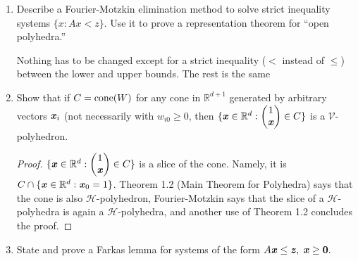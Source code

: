 \documentclass{article}
\begin{document}
\begin{enumerate}
\begin{solution}
\begin{enumerate}[label=(\roman*)]
    \item Recall that all cyclic polytopes are simplicial. The facets for $C_3(6) = C_3(\textbf{x}(0), \textbf{x}(1), \ldots, \textbf{x}(5))$ are (by Gale's evenness)
    \[\{\{1,2,3\}, \{1,3,4\}, \{1,4,5\}, \{1,5,6\}, \{1,2,6\}, \{2,3,6\}, \{3,4,6\}, \{4,5,6\}\}\]
    The inequalities can be found through a simple calculation.

    \item skipped 

    \item skipped
\end{enumerate}
\end{solution}

\item Describe a Fourier-Motzkin elimination method to solve strict inequality systems $\{x : Ax < z\}$. Use it to prove a representation theorem for ``open polyhedra.''

\begin{solution}
    Nothing has to be changed except for a strict inequality ($<$ instead of $\leq$) between the lower and upper bounds. The rest is the same
\end{solution}

\item Show that if $C = \operatorname{cone}(W)$ for any cone in $\mathbb{R}^{d+1}$ generated by arbitrary vectors $\textbf{\textit{x}}_i$ (not necessarily with $w_{i0} \geq 0$, then $\{\textbf{\textit{x}} \in \mathbb{R}^d : \begin{pmatrix}
    1 \\
    {\textbf{\textit{x}}}
\end{pmatrix} \in C\}$ is a $\mathcal{V}$-polyhedron.

\begin{proof}
    $\{\textbf{\textit{x}} \in \mathbb{R}^d : \begin{pmatrix}
    1 \\
    {\textbf{\textit{x}}}
\end{pmatrix} \in C\}$ is a slice of the cone. Namely, it is $C \cap \{\textbf{\textit{x}}\in \mathbb{R}^d: \textbf{\textit{x}}_0 = 1\}$. Theorem 1.2 (Main Theorem for Polyhedra) says that the cone is also $\mathcal{H}$-polyhedron, Fourier-Motzkin says that the slice of a $\mathcal{H}$-polyhedra is again a $\mathcal{H}$-polyhedra, and another use of Theorem 1.2 concludes the proof.
\end{proof}

\item State and prove a Farkas lemma for systems of the form
$A\textbf{\textit{x}} \le \textbf{\textit{z}},\; \textbf{\textit{x}} \ge \textbf{0}.$


\end{enumerate}
\end{document}
